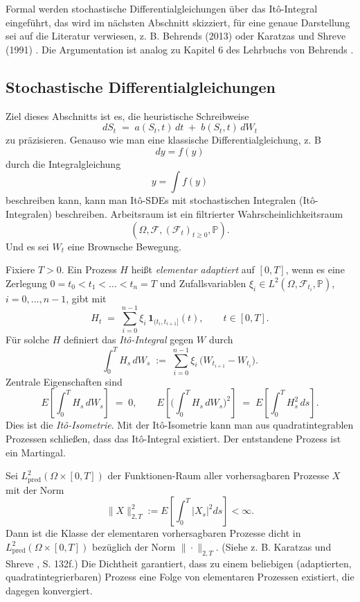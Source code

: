 Formal werden stochastische Differentialgleichungen über das It\^o-Integral eingeführt, das wird 
im nächsten Abschnitt skizziert, für eine genaue Darstellung sei auf die Literatur verwiesen, z. B. Behrends (2013) \cite{behrends} oder Karatzas und Shreve (1991) \cite{karatzas_brownian_1991}.
Die Argumentation ist analog zu Kapitel 6 des Lehrbuchs von Behrends \cite{behrends}.

\subsection{Stochastische Differentialgleichungen}
Ziel dieses Abschnitts ist es, die heuristische Schreibweise
$$
dS_t \;=\; a(S_t,t)\,dt \;+\; b(S_t,t)\,dW_t
$$
zu präzisieren. Genauso wie man eine klassische Differentialgleichung, z. B
$$dy = f(y)$$
durch die Integralgleichung
$$y = \int f(y)$$
beschreiben kann, kann man It\^o-SDEs mit stochastischen Integralen (It\^o-Integralen) beschreiben.
Arbeitsraum ist ein filtrierter Wahrscheinlichkeitsraum
$$
(\Omega,\mathcal F,(\mathcal F_t)_{t\ge 0},\mathbb P).
$$
Und es sei $W_t$ eine Brownsche Bewegung.

\begin{defi}
Fixiere $T>0$. Ein Prozess $H$ heißt \emph{elementar adaptiert} auf $[0,T]$, wenn es eine Zerlegung $0=t_0<t_1<\dots<t_n=T$ und Zufallsvariablen $\xi_i\in L^2(\Omega,\mathcal F_{t_i},\mathbb P)$, $i=0,\dots,n-1$, gibt mit
$$
H_t \;=\; \sum_{i=0}^{n-1} \xi_i\,\mathbf 1_{(t_i,t_{i+1}]}(t),\qquad t\in[0,T].
$$
Für solche $H$ definiert das \emph{It\^o-Integral} gegen $W$ durch
$$
\int_0^T H_s\,dW_s \;:=\; \sum_{i=0}^{n-1} \xi_i\,\big(W_{t_{i+1}}-W_{t_i}\big).
$$
Zentrale Eigenschaften sind
$$
E\!\left[\int_0^T H_s\,dW_s\right] \;=\; 0,\qquad
E\!\left[\Big(\int_0^T H_s\,dW_s\Big)^{\!2}\right] \;=\; E\!\left[\int_0^T H_s^2\,ds\right].
$$
Dies ist die \emph{It\^o-Isometrie}. Mit der It\^o-Isometrie kann man aus quadratintegrablen Prozessen schließen, dass das It\^o-Integral existiert. Der entstandene Prozess ist ein Martingal.
\end{defi}

\begin{satz}
Sei $L^2_{\mathrm{pred}}(\Omega\times[0,T])$ der Funktionen-Raum aller vorhersagbaren Prozesse $X$ mit der Norm
$$\|X\|_{2,T}^2 := E \left [ \int_0^T |X_s|^2 ds \right ] < \infty.$$
Dann ist die Klasse der elementaren vorhersagbaren Prozesse dicht in $L^2_{\mathrm{pred}}(\Omega\times[0,T])$ bezüglich der Norm $\|\cdot\|_{2,T}$. (Siehe z. B. Karatzas und Shreve \cite{karatzas_brownian_1991}, S. 132f.) Die Dichtheit garantiert, dass zu einem beliebigen
(adaptierten, quadratintegrierbaren) Prozess eine Folge von elementaren Prozessen existiert, die dagegen konvergiert.
\end{satz}

